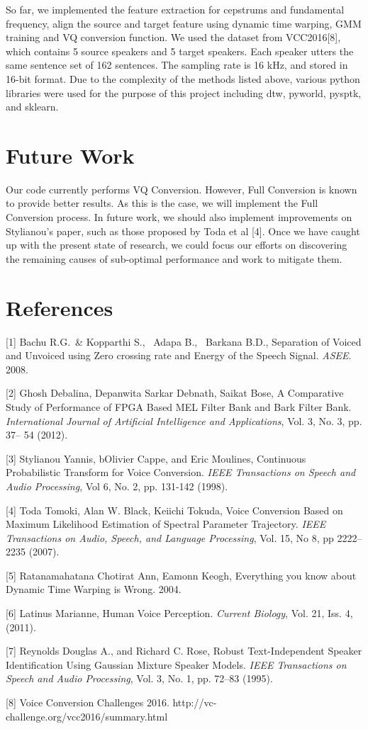 \documentclass{article}
\begin{document}
So far, we implemented the feature extraction for cepstrums and fundamental frequency, align the source and target feature using dynamic time warping, GMM training and VQ conversion function. We used the dataset from VCC2016[8], which contains 5 source speakers and 5 target speakers. Each speaker utters the same sentence set of 162 sentences. The sampling rate is 16 kHz, and stored in 16-bit format. Due to the complexity of the methods listed above, various python libraries were used for the purpose of this project including dtw, pyworld, pysptk, and sklearn.

\section{Future Work}
  Our code currently performs VQ Conversion. However, Full Conversion is known to provide better results. As this is the case, we will implement the Full Conversion process. In future work, we should also implement improvements on Stylianou's paper, such as those proposed by Toda et al [4]. Once we have caught up with the present state of research, we could focus our efforts on discovering the remaining causes of sub-optimal performance and work to mitigate them.

\section*{References}

\small

[1] Bachu R.G.\ \& Kopparthi S., \ Adapa B., \ Barkana B.D., Separation of Voiced and Unvoiced using Zero crossing rate and Energy of the Speech Signal.  {\it ASEE}. 2008. 
 
[2] Ghosh Debalina,  Depanwita Sarkar Debnath, Saikat Bose, A Comparative Study of Performance of FPGA Based MEL Filter Bank and Bark Filter Bank. {\it International Journal of Artificial Intelligence and Applications}, Vol. 3, No. 3, pp. 37-- 54 (2012). 
 
[3] Stylianou  Yannis,  bOlivier Cappe, and Eric Moulines, Continuous Probabilistic Transform for Voice Conversion. {\it IEEE Transactions on Speech and Audio Processing}, Vol 6, No. 2, pp. 131-142 (1998). 
 
[4] Toda Tomoki, Alan W. Black, Keiichi Tokuda, Voice Conversion Based on Maximum Likelihood Estimation of Spectral Parameter Trajectory. {\it IEEE Transactions on Audio, Speech, and Language Processing}, Vol. 15, No 8, pp 2222--2235 (2007). 
 
[5] Ratanamahatana Chotirat Ann, Eamonn Keogh, Everything you know about Dynamic Time Warping is Wrong. 2004. 
 
[6] Latinus Marianne, Human Voice Perception. {\it Current Biology}, Vol. 21, Iss. 4, (2011). 
 
[7] Reynolds Douglas A., and Richard C. Rose, Robust Text-Independent Speaker Identification Using Gaussian Mixture Speaker Models. {\it IEEE Transactions on Speech and Audio Processing}, Vol. 3, No. 1, pp. 72--83 (1995).

[8] Voice Conversion Challenges 2016. http://vc-challenge.org/vcc2016/summary.html
\end{document}
